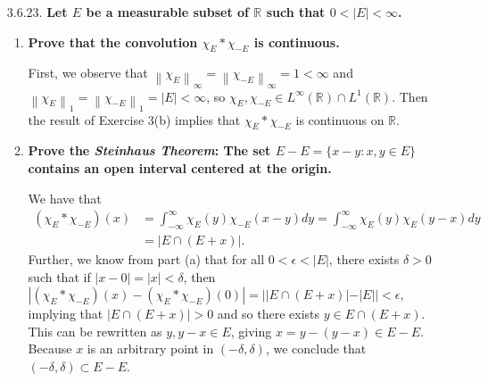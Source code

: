 \documentclass[a4paper,12pt]{article}
\newcommand{\norm}[1]{\left\lVert#1\right\rVert}
\begin{document}
\begin{enumerate}
    \item[3.6.23.]
        \boldmath\textbf{Let $E$ be a measurable subset of $\mathbb{R}$ such that $0 < |E| < \infty$.
        }\unboldmath \par
        \begin{enumerate}
            \item
                \boldmath\textbf{Prove that the convolution $\chi_E * \chi_{-E}$ is continuous.
                }\unboldmath \par
                First, we observe that $\norm{\chi_E}_\infty = \norm{\chi_{-E}}_\infty = 1 < \infty$ and $\norm{\chi_E}_1 = \norm{\chi_{-E}}_1 = |E| < \infty$, so $\chi_E, \chi_{-E} \in L^\infty(\mathbb{R}) \cap L^1(\mathbb{R})$. Then the result of Exercise 3(b) implies that $\chi_E * \chi_{-E}$ is continuous on $\mathbb{R}$.
                \iffalse
                    For all $x \in \mathbb{R}$, then,
                    \begin{align*}
                        |(\chi_E * \chi_{-E})(x + h) - (\chi_E * \chi_{-E})(x)|
                        &= \left| \int_{-\infty}^\infty \chi_E(y) [\chi_{-E}(x + h - y) - \chi_{-E}(x - y)] dy \right| \\
                        &\leq \norm{\chi_E}_\infty \int_{-\infty}^\infty |\chi_{-E}(x + h - y) - \chi_{-E}(x - y)| dy \\
                        &= \int_{-\infty}^\infty |\chi_{-E}(h - y') - \chi_{-E}(-y')| dy' \to 0
                    \end{align*}
                    as $h \to 0$; because the quantity on the last line depends only on $h$ and not on $x$, $\chi_E * \chi_{-E}$ is (uniformly) continuous on $\mathbb{R}$.
                \fi
            \item
                \boldmath\textbf{Prove the \emph{Steinhaus Theorem}: The set $E - E = \{ x - y : x, y \in E \}$ contains an open interval centered at the origin.
                }\unboldmath \par
                We have that
                \begin{align*}
                    (\chi_E * \chi_{-E})(x) &= \int_{-\infty}^\infty \chi_E(y) \chi_{-E}(x - y)dy = \int_{-\infty}^\infty \chi_E(y) \chi_E(y - x)dy \\
                    &= |E \cap (E + x)|.
                \end{align*}
                Further, we know from part (a) that for all $0 < \epsilon < |E|$, there exists $\delta > 0$ such that if $|x - 0| = |x| < \delta$, then $|(\chi_E * \chi_{-E})(x) - (\chi_E * \chi_{-E})(0)| = ||E \cap (E + x)| - |E|| < \epsilon$, implying that $|E \cap (E + x)| > 0$ and so there exists $y \in E \cap (E + x)$. This can be rewritten as $y, y - x \in E$, giving $x = y - (y - x) \in E - E$. Because $x$ is an arbitrary point in $(-\delta, \delta)$, we conclude that $(-\delta, \delta) \subset E - E$.
        \end{enumerate}
\end{enumerate}
\end{document}
